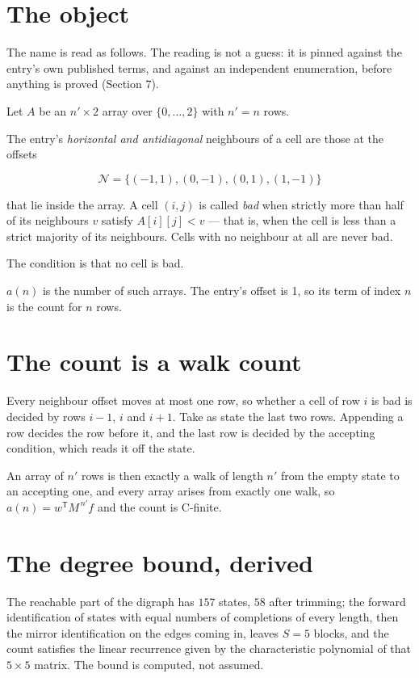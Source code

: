 \documentclass[11pt]{article}
\theoremstyle{definition}
\begin{document}
\section{The object}

The name is read as follows. The reading is not a guess: it is pinned against the entry's own published terms, and against an independent enumeration, before anything is proved (Section 7).

Let $A$ be an $n' \times 2$ array over $\{0,\dots,2\}$ with $n' = n$ rows.

The entry's {\itshape horizontal and antidiagonal} neighbours of a cell are those at the offsets

\[\mathcal{N} = \{(-1,1), (0,-1), (0,1), (1,-1)\}\]

that lie inside the array. A cell $(i,j)$ is called {\itshape bad} when strictly more than half of its neighbours $v$ satisfy $A[i][j] < v$ --- that is, when the cell is less than a strict majority of its neighbours. Cells with no neighbour at all are never bad.

The condition is that no cell is bad.

$a(n)$ is the number of such arrays. The entry's offset is 1, so its term of index $n$ is the count for $n$ rows.

\section{The count is a walk count}

Every neighbour offset moves at most one row, so whether a cell of row $i$ is bad is decided by rows $i-1$, $i$ and $i+1$. Take as state the last two rows. Appending a row decides the row before it, and the last row is decided by the accepting condition, which reads it off the state.

An array of $n'$ rows is then exactly a walk of length $n'$ from the empty state to an accepting one, and every array arises from exactly one walk, so $a(n) = w^{\mathsf T}M^{\,n'}f$ and the count is C-finite.

\section{The degree bound, derived}

The reachable part of the digraph has $157$ states, $58$ after trimming; the forward identification of states with equal numbers of completions of every length, then the mirror identification on the edges coming in, leaves $S = 5$ blocks, and the count satisfies the linear recurrence given by the characteristic polynomial of that $5\times5$ matrix. The bound is computed, not assumed.
\end{document}
